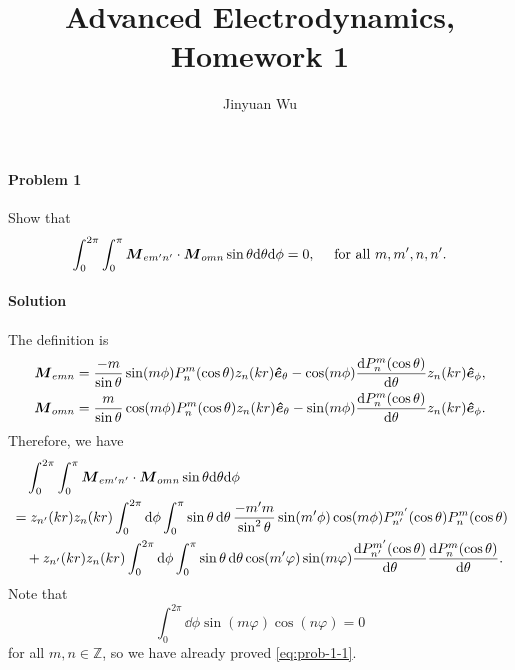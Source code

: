 \documentclass[hyperref, a4paper]{article}
\title{Advanced Electrodynamics, Homework 1}
\author{Jinyuan Wu}
\begin{document}
\maketitle

\paragraph{Problem 1} Show that 
\begin{equation}
    \int_{0}^{2 \pi} \int_{0}^{\pi} \vb*{M}_{e m^{\prime} n^{\prime}} \cdot \vb*{M}_{o m n} \sin \theta \mathrm{d} \theta \mathrm{d} \phi=0 ,\quad\text { for all } m, m^{\prime}, n, n^{\prime}.
    \label{eq:prob-1-1}
\end{equation}

\paragraph{Solution} The definition is 
\begin{equation}
    \begin{aligned}
        \vb*{M}_{e m n} &=\frac{-m}{\sin \theta} \sin (m \phi) P_{n}^{m}(\cos \theta) z_{n}(k r) \vu*{e}_{\theta}-\cos (m \phi) \frac{\mathrm{d} P_{n}^{m}(\cos \theta)}{\mathrm{d} \theta} z_{n}(k r) \vu*{e}_{\phi} ,\\
        \vb*{M}_{o m n} &=\frac{m}{\sin \theta} \cos (m \phi) P_{n}^{m}(\cos \theta) z_{n}(k r) \vu*{e}_{\theta}-\sin (m \phi) \frac{\mathrm{d} P_{n}^{m} (\cos \theta)}{\mathrm{d} \theta} z_{n}(k r) \vu*{e}_{\phi}.
        \end{aligned}
\end{equation}
Therefore, we have 
\[
    \begin{aligned}
        &\quad \int_{0}^{2 \pi} \int_{0}^{\pi} \vb*{M}_{e m^{\prime} n^{\prime}} \cdot \vb*{M}_{o m n} \sin \theta \mathrm{d} \theta \mathrm{d} \phi  \\
        &= z_{n'}(kr) z_n(kr) \int_0^{2\pi} \dd{\phi} \int_0^\pi \sin \theta \dd{\theta} \frac{-m' m}{\sin^2 \theta} \sin(m' \phi) \cos(m \phi) P^{m'}_{n'}(\cos\theta) P^m_n(\cos\theta)  \\
        &\quad + z_{n'}(kr) z_n(kr) \int_0^{2\pi} \dd{\phi} \int_0^\pi \sin \theta \dd{\theta} \cos(m' \varphi) \sin(m \varphi) \frac{\mathrm{d} P_{n'}^{m'} (\cos \theta)}{\mathrm{d} \theta} \frac{\mathrm{d} P_{n}^{m} (\cos \theta)}{\mathrm{d} \theta}.
    \end{aligned}
\]
Note that 
\[
    \int_0^{2\pi} \dd{\phi} \sin(m \varphi) \cos(n \varphi) = 0 
\]
for all $m, n \in \mathbb{Z}$, so we have already proved \eqref{eq:prob-1-1}.
\end{document}
